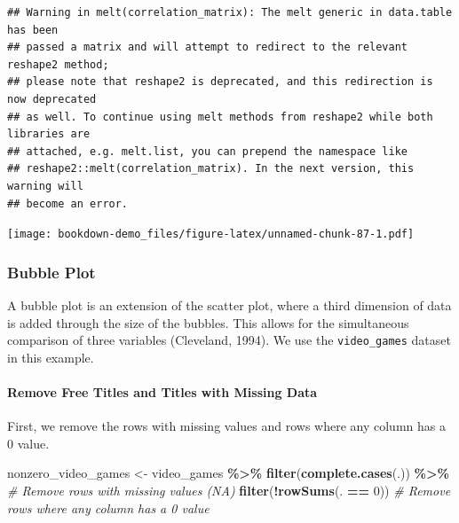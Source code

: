 \documentclass[
  b5paper]{book}
\newenvironment{Shaded}{\begin{snugshade}}{\end{snugshade}}
\newcommand{\CommentTok}[1]{\textcolor[rgb]{0.56,0.35,0.01}{\textit{#1}}}
\newcommand{\DecValTok}[1]{\textcolor[rgb]{0.00,0.00,0.81}{#1}}
\newcommand{\FunctionTok}[1]{\textcolor[rgb]{0.13,0.29,0.53}{\textbf{#1}}}
\newcommand{\NormalTok}[1]{#1}
\newcommand{\OtherTok}[1]{\textcolor[rgb]{0.56,0.35,0.01}{#1}}
\newcommand{\SpecialCharTok}[1]{\textcolor[rgb]{0.81,0.36,0.00}{\textbf{#1}}}
\begin{document}
\begin{verbatim}
## Warning in melt(correlation_matrix): The melt generic in data.table has been
## passed a matrix and will attempt to redirect to the relevant reshape2 method;
## please note that reshape2 is deprecated, and this redirection is now deprecated
## as well. To continue using melt methods from reshape2 while both libraries are
## attached, e.g. melt.list, you can prepend the namespace like
## reshape2::melt(correlation_matrix). In the next version, this warning will
## become an error.
\end{verbatim}

\texttt{[image: bookdown-demo\_files/figure-latex/unnamed-chunk-87-1.pdf]}

\hypertarget{bubble-plot}{%
\subsubsection*{Bubble Plot}\label{bubble-plot}}

A bubble plot is an extension of the scatter plot, where a third dimension of data is added through the size of the bubbles. This allows for the simultaneous comparison of three variables (Cleveland, 1994). We use the \texttt{video\_games} dataset in this example.

\hypertarget{remove-free-titles-and-titles-with-missing-data}{%
\paragraph{Remove Free Titles and Titles with Missing Data}\label{remove-free-titles-and-titles-with-missing-data}}

First, we remove the rows with missing values and rows where any column has a 0 value.

\begin{Shaded}
\begin{Highlighting}[]
\NormalTok{nonzero\_video\_games }\OtherTok{\textless{}{-}}\NormalTok{ video\_games }\SpecialCharTok{\%\textgreater{}\%}
  \FunctionTok{filter}\NormalTok{(}\FunctionTok{complete.cases}\NormalTok{(.)) }\SpecialCharTok{\%\textgreater{}\%}  \CommentTok{\# Remove rows with missing values (NA)}
  \FunctionTok{filter}\NormalTok{(}\SpecialCharTok{!}\FunctionTok{rowSums}\NormalTok{(. }\SpecialCharTok{==} \DecValTok{0}\NormalTok{))  }\CommentTok{\# Remove rows where any column has a 0 value}
\end{Highlighting}
\end{Shaded}
\end{document}
